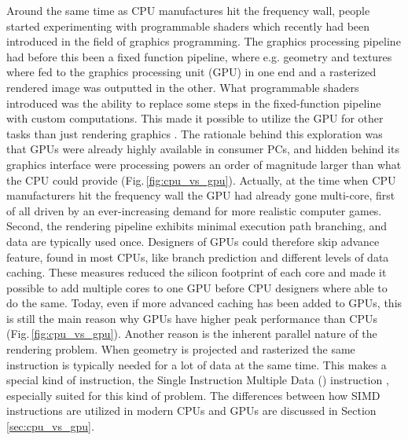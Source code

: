 Around the same time as CPU manufactures hit the frequency wall, people started experimenting with programmable shaders which recently had been introduced in the field of graphics programming. The graphics processing pipeline had before this been a fixed function pipeline, where e.g. geometry and textures where fed to the graphics processing unit (GPU) in one end and a rasterized rendered image was outputted in the other. What programmable shaders  introduced was the ability to replace some steps in the fixed-function pipeline with custom computations. This made it possible to utilize the GPU for other tasks than just rendering graphics \cite{Seland2007}. The rationale behind this exploration was that GPUs were already highly available in consumer PCs, and hidden behind its graphics interface were processing powers an order of magnitude larger than what the CPU could provide (Fig.\,\ref{fig:cpu_vs_gpu}). Actually, at the time when CPU manufacturers hit the frequency wall the GPU had already gone multi-core, first of all driven by an ever-increasing demand for more realistic computer games. Second, the rendering pipeline exhibits minimal execution path branching, and data are typically used once. Designers of GPUs could therefore skip advance feature, found in most CPUs, like branch prediction and different levels of data caching. These measures reduced the silicon footprint of each core and made it possible to add multiple cores to one GPU before CPU designers where able to do the same. Today, even if more advanced caching has been added to GPUs, this is still the main reason why GPUs have higher peak performance than CPUs (Fig.\,\ref{fig:cpu_vs_gpu}). Another reason is the inherent parallel nature of the rendering problem. When geometry is projected and rasterized the same instruction is typically needed for a lot of data at the same time. This makes a special kind of instruction, the Single Instruction Multiple Data () instruction \cite{Flynn1966}, especially suited for this kind of problem. The differences between how SIMD instructions are utilized in modern CPUs and GPUs are discussed in Section \ref{sec:cpu_vs_gpu}.

